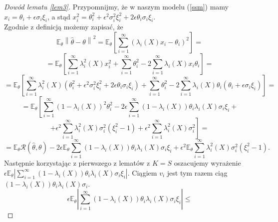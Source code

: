 \documentclass{mwart}
\newcommand{\norm}[1]{\left\lVert#1\right\rVert}
\begin{document}
\begin{proof}[Dowód lematu \ref{lem3}]
Przypomnijmy, że w naszym modelu (\ref{ssm}) mamy $x_i=\theta_i+\epsilon\sigma_i\xi_i$, a stąd $x_i^2=\theta^2_i+\epsilon^2\sigma^2_i\xi_i^2+2\epsilon\theta_i\sigma_i\xi_i$. \\
Zgodnie z definicją możemy zapisać, że
\begin{displaymath}
\mathbb{E}_{\theta}\norm{\hat{\theta}-\theta}^2=\mathbb{E}_{\theta}\left[\sum_{i=1}^{\infty}\left(\lambda_i(X)x_i-\theta_i\right)^2\right]=
\end{displaymath}
\begin{displaymath}
=\mathbb{E}_{\theta}\left[\sum_{i=1}^{\infty}\lambda_i^2(X)x_i^2+\sum_{i=1}^{\infty}\theta_i^2-2\sum_{i=1}^{\infty}\lambda_i(X)x_i\theta_i\right]=
\end{displaymath}
\begin{displaymath}
=\mathbb{E}_{\theta}\left[\sum_{i=1}^{\infty}\lambda_i^2(X)\left(\theta^2_i+\epsilon^2\sigma^2_i\xi_i^2+2\epsilon\theta_i\sigma_i\xi_i\right)+\sum_{i=1}^{\infty}\theta_i^2-2\sum_{i=1}^{\infty}\lambda_i(X)\theta_i\left(\theta_i+\epsilon\sigma_i\xi_i\right)\right]=
\end{displaymath}
\begin{displaymath}
=\mathbb{E}_{\theta}\left[\sum_{i=1}^{\infty}(1-\lambda_i(X))^2\theta_i^2-2\epsilon\sum_{i=1}^{\infty}(1-\lambda_i(X))\theta_i\lambda_i(X)\sigma_i\xi_i+\right.
\end{displaymath}
\begin{displaymath}
+\left.\epsilon^2\sum_{i=1}^{\infty}\lambda_i^2(X)\sigma_i^2(\xi^2_i-1)+\epsilon^2\sum_{i=1}^{\infty}\lambda_i^2(X)\sigma_i^2\right]=
\end{displaymath}
\begin{displaymath}
=\mathbb{E}_{\theta}\mathcal{R}(\hat{\theta},\theta)-2\epsilon\mathbb{E}_{\theta}\sum_{i=1}^{\infty}(1-\lambda_i(X))\theta_i\lambda_i(X)\sigma_i\xi_i+\epsilon^2\mathbb{E}_{\theta}\sum_{i=1}^{\infty}\lambda_i^2(X)\sigma_i^2(\xi^2_i-1).
\end{displaymath}
Następnie korzystając z pierwszego z lematów z $K=S$ oszacujemy wyrażenie $\epsilon\mathbb{E}_{\theta}\left|\sum_{i=1}^{\infty}(1-\lambda_i(X))\theta_i\lambda_i(X)\sigma_i\xi_i\right|$. Ciągiem $v_i$ jest tym razem ciąg $(1-\lambda_i(X))\theta_i\lambda_i(X)\sigma_i$.
\begin{displaymath}
\epsilon\mathbb{E}_{\theta}\left|\sum_{i=1}^{\infty}(1-\lambda_i(X))\theta_i\lambda_i(X)\sigma_i\xi_i\right|\leq
\end{displaymath}

\end{proof}
\end{document}
